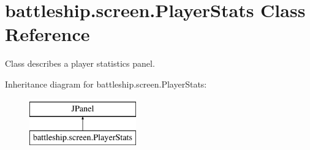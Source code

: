 \hypertarget{classbattleship_1_1screen_1_1PlayerStats}{}\section{battleship.\+screen.\+Player\+Stats Class Reference}
\label{classbattleship_1_1screen_1_1PlayerStats}


Class describes a player statistics panel.  


Inheritance diagram for battleship.\+screen.\+Player\+Stats\+:\begin{figure}[H]
\begin{center}
\leavevmode
\includegraphics[height=2.000000cm]{classbattleship_1_1screen_1_1PlayerStats}
\end{center}
\end{figure}
